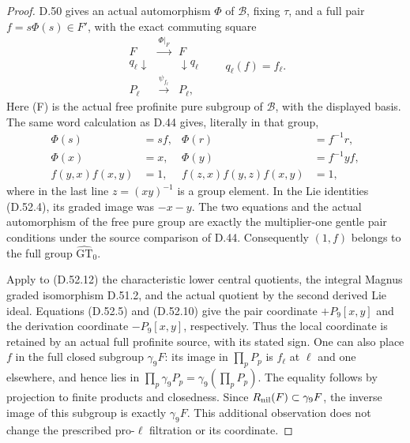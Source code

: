 \begin{proof}
D.50 gives an actual automorphism \(\Phi\) of
\(\mathcal B\), fixing \(\tau\), and a full pair
\(f=s\Phi(s)\in F'\), with the exact commuting square
\[
 \begin{array}{ccc}
 F&\xrightarrow{\Phi|_F}&F\\
 q_\ell\downarrow&&\downarrow q_\ell\\
 P_\ell&\xrightarrow{\psi_{f_\ell}}&P_\ell,
 \end{array}
 \qquad q_\ell(f)=f_\ell.
 \tag{D.52.12}
\]
Here (F) is the actual free profinite pure subgroup of
\(\mathcal B\), with the displayed basis. The same word
calculation as D.44 gives, literally in that group,
\[
 \begin{aligned}
  \Phi(s)&=sf,&\Phi(r)&=f^{-1}r,\\
  \Phi(x)&=x,&\Phi(y)&=f^{-1}yf,\\
  f(y,x)f(x,y)&=1,&
  f(z,x)f(y,z)f(x,y)&=1,
 \end{aligned}
 \tag{D.52.13}
\]
where in the last line \(z=(xy)^{-1}\) is a group element.
In the Lie identities \textup{(D.52.4)}, its graded image
was \(-x-y\). The two equations and the actual automorphism
of the free pure group are exactly the multiplier-one gentle
pair conditions under the source comparison of D.44.
Consequently \((1,f)\) belongs to the full group
\(\widehat{\mathrm{GT}}_0\).

Apply to \textup{(D.52.12)} the characteristic lower central
quotients, the integral Magnus graded isomorphism D.51.2,
and the actual quotient by the second derived Lie ideal.
Equations \textup{(D.52.5)} and \textup{(D.52.10)} give
the pair coordinate \(+P_9[x,y]\) and the derivation
coordinate \(-P_9[x,y]\), respectively. Thus the local
coordinate is retained by an actual full profinite source,
with its stated sign. One can also place \(f\) in the
full closed subgroup \(\gamma_9F\): its image in
\(\prod_pP_p\) is \(f_\ell\) at \(\ell\) and one
elsewhere, and hence lies in
\(\prod_p\gamma_9P_p=\gamma_9(\prod_pP_p)\).
The equality follows by projection to finite products and
closedness. Since \(R_{\rm nil}(F)\subset\gamma_9F\),
the inverse image of this subgroup is exactly \(\gamma_9F\).
This additional observation does not change the prescribed
pro-\(\ell\) filtration or its coordinate.


\end{proof}
